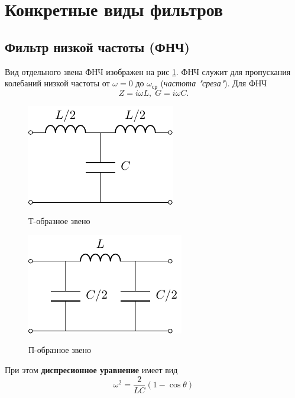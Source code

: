 \section{Конкретные виды фильтров}
\subsection{Фильтр низкой частоты (ФНЧ)}
Вид отдельного звена ФНЧ изображен на рис \ref{fig:1.1}. ФНЧ служит для пропускания колебаний низкой частоты от $\omega=0$ до $\omega_{\text{ср}}$ (\textit{частота "среза"}). Для ФНЧ
\begin{equation}
\label{eq:5.1.1}
Z=i\omega L,\;G=i\omega C.
\end{equation}
\begin{figure}[h!]
	\begin{minipage}{0.49\linewidth}
		\centering
		\includegraphics[]{chem/FLF/FLFT.pdf}
		\caption*{Т-образное звено}
	\end{minipage}
\begin{minipage}{0.49\linewidth}
	\centering
	\includegraphics[]{chem/FLF/FLFP.pdf}
	\caption*{П-образное звено}
\end{minipage}
\caption{}
\label{fig:1.1}
\end{figure}
При этом \textbf{диспресионное уравнение} имеет вид 
\begin{equation}
\label{eq:5.1.2}
\omega^2=\frac{2}{LC}(1-\cos\theta)
\end{equation}
